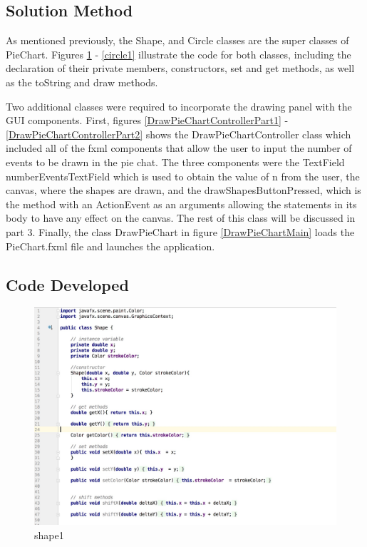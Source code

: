 \documentclass[a4paper,12pt]{article}
\begin{document}
\subsection{Solution Method}

As mentioned  previously, the Shape, and Circle classes are the super classes of PieChart. Figures \ref{shape1} - \ref{circle1} illustrate the code for both classes, including the declaration of their private members, constructors, set and get methods, as well as the toString and draw methods.  \newline

\vspace{0.25cm}
Two additional classes were required to incorporate the drawing panel with the GUI components. First, figures \ref{DrawPieChartControllerPart1} - \ref{DrawPieChartControllerPart2} shows the DrawPieChartController class which included all of the fxml components that allow the user to input the number of events to be drawn in the pie chat. The three components were the TextField numberEventsTextField which is used to obtain the value of n from the user, the canvas, where the shapes are drawn, and the drawShapesButtonPressed, which is the method with an ActionEvent as an arguments allowing the statements in its body to have any effect on the canvas. The rest of this class will be discussed in part 3.  Finally, the class DrawPieChart in figure \ref{DrawPieChartMain}  loads the PieChart.fxml file  and launches the application. 


\subsection{Code Developed}
\begin{figure}[H]
   \centering
   \includegraphics[width = 17cm]{shape1} %
   \caption{shape1}
   \label{shape1}
\end{figure}
\end{document}
